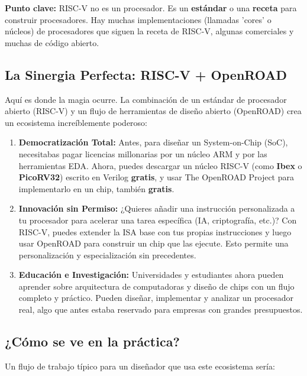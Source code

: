 \documentclass[12pt,a4paper]{article}
\begin{document}
\textbf{Punto clave:} RISC-V no es un procesador. Es un \textbf{estándar} o una \textbf{receta} para construir procesadores. Hay muchas implementaciones (llamadas 'cores' o núcleos) de procesadores que siguen la receta de RISC-V, algunas comerciales y muchas de código abierto.

\subsection{La Sinergia Perfecta: RISC-V + OpenROAD}

Aquí es donde la magia ocurre. La combinación de un estándar de procesador abierto (RISC-V) y un flujo de herramientas de diseño abierto (OpenROAD) crea un ecosistema increíblemente poderoso:

\begin{enumerate}
    \item \textbf{Democratización Total:} Antes, para diseñar un System-on-Chip (SoC), necesitabas pagar licencias millonarias por un núcleo ARM y por las herramientas EDA. Ahora, puedes descargar un núcleo RISC-V (como \textbf{Ibex} o \textbf{PicoRV32}) escrito en Verilog \textbf{gratis}, y usar The OpenROAD Project para implementarlo en un chip, también \textbf{gratis}.

    \item \textbf{Innovación sin Permiso:} ¿Quieres añadir una instrucción personalizada a tu procesador para acelerar una tarea específica (IA, criptografía, etc.)? Con RISC-V, puedes extender la ISA base con tus propias instrucciones y luego usar OpenROAD para construir un chip que las ejecute. Esto permite una personalización y especialización sin precedentes.

    \item \textbf{Educación e Investigación:} Universidades y estudiantes ahora pueden aprender sobre arquitectura de computadoras y diseño de chips con un flujo completo y práctico. Pueden diseñar, implementar y analizar un procesador real, algo que antes estaba reservado para empresas con grandes presupuestos.
\end{enumerate}

\subsection{¿Cómo se ve en la práctica?}

Un flujo de trabajo típico para un diseñador que usa este ecosistema sería:
\end{document}
